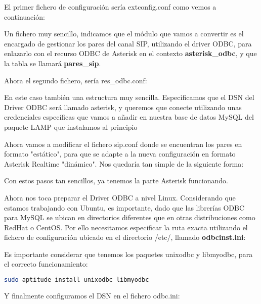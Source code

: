 El primer fichero de configuración sería extconfig.conf como vemos a continuación:



Un fichero muy sencillo, indicamos que el módulo que vamos a convertir es el encargado de gestionar los pares del canal SIP, utilizando el driver ODBC, para enlazarlo con el recurso ODBC de Asterisk en el contexto \textbf{asterisk\_odbc}, y que la tabla se llamará \textbf{pares\_sip}.

Ahora el segundo fichero, sería res\_odbc.conf:



En este caso también una estructura muy sencilla. Especificamos que el DSN del Driver ODBC será llamado asterisk, y queremos que conecte utilizando unas credenciales específicas que vamos a añadir en nuestra base de datos MySQL del paquete LAMP que instalamos al principio

Ahora vamos a modificar el fichero sip.conf donde se encuentran los pares en formato "estático", para que se adapte a la nueva configuración en formato Asterisk Realtime "dinámico". Nos quedaría tan simple de la siguiente forma:



Con estos pasos tan sencillos, ya tenemos la parte Asterisk funcionando.

Ahora nos toca preparar el Driver ODBC a nivel Linux. Considerando que estamos trabajando con Ubuntu, es importante, dado que las librerías ODBC para MySQL se ubican en directorios diferentes que en otras distribuciones como RedHat o CentOS. Por ello necesitamos especificar la ruta exacta utilizando el fichero de configuración ubicado en el directorio /etc/, llamado \textbf{odbcinst.ini}:



Es importante considerar que tenemos los paquetes unixodbc y libmyodbc, para el correcto funcionamiento:

\begin{lstlisting}[language=sh]
sudo aptitude install unixodbc libmyodbc
\end{lstlisting}

Y finalmente configuramos el DSN en el fichero odbc.ini:



